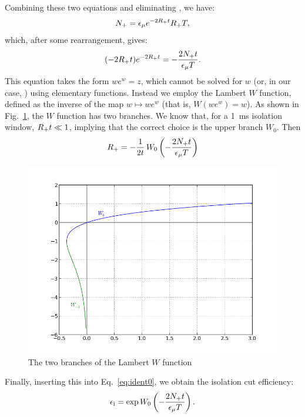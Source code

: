 \documentclass[../thesis.tex]{subfiles}
\begin{document}
Combining these two equations and eliminating \eisol, we have:
\begin{equation}
  N_\mathrm{+} = \epsilon_\mathrm{\mu} e^{-2R_\mathrm{+} t} R_\mathrm{+} T,
\end{equation}
which, after some rearrangement, gives:
\begin{equation}
  (-2 R_\mathrm{+} t) e^{-2 R_\mathrm{+} t} = - \frac{2 N_\mathrm{+} t}{\epsilon_\mathrm{\mu} T}.
\end{equation}
This equation takes the form $we^w = z$, which cannot be solved for $w$ (or, in our case, \Rplu) using elementary functions. Instead we employ the Lambert $W$ function, defined as the inverse of the map $w \mapsto we^w$ (that is, $W(we^w) = w$). As shown in Fig.~\ref{fig:lambertW}, the $W$ function has two branches. We know that, for a 1~ms isolation window, $R_\mathrm{+} t \ll 1$, implying that the correct choice is the upper branch $W_0$. Then
\begin{equation}
  R_\mathrm{+} = -\frac{1}{2t}\, W_0 \left(-\frac{2N_\mathrm{+} t}{\epsilon_\mathrm{\mu} T}\right)
\end{equation}

\begin{figure}
  \centering
  \includegraphics[scale=0.7]{../images/lambertW.png}
  \caption{The two branches of the Lambert $W$ function}
  \label{fig:lambertW}
\end{figure}

Finally, inserting this into Eq.~\ref{eq:ident0}, we obtain the isolation cut efficiency:
\begin{equation}
  \epsilon_\mathrm{i} = \exp W_0 \left( -\frac{2N_\mathrm{+} t}{\epsilon_\mathrm{\mu} T} \right).
\end{equation}
\end{document}
